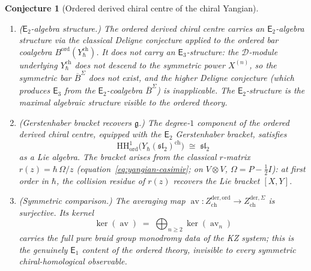 \documentclass[11pt,reqno]{amsart}
\newtheorem{conjecture}[theorem]{Conjecture}
\theoremstyle{definition}
\theoremstyle{remark}
\newcommand{\cD}{\mathcal{D}}
\newcommand{\HH}{\mathrm{HH}}
\newcommand{\Eone}{\mathsf{E}_{1}}
\newcommand{\Etwo}{\mathsf{E}_{2}}
\newcommand{\Ethree}{\mathsf{E}_{3}}
\DeclareMathOperator{\av}{av}
\newcommand{\fg}{\mathfrak{g}}
\newcommand{\BarSig}{\overline{B}^{\Sigma}}
\numberwithin{equation}{section}
\begin{document}
\begin{conjecture}[Ordered derived chiral centre of the
chiral Yangian]
\begin{enumerate}[label=\textup{(\roman*)}]
\item \textup{($\Etwo$-algebra structure.)}
  The ordered derived chiral centre carries an
  $\Etwo$-algebra structure via the classical Deligne
  conjecture applied to the ordered bar coalgebra
  $B^{\mathrm{ord}}(Y_\hbar^{\mathrm{ch}})$. It does
  \emph{not} carry an $\Ethree$-structure: the
  $\cD$-module underlying $Y_\hbar^{\mathrm{ch}}$ does
  not descend to the symmetric power $X^{(n)}$, so
  the symmetric bar $\BarSig$ does not exist, and the
  higher Deligne conjecture
  \textup{(}which produces $\Ethree$ from the
  $\Etwo$-coalgebra $\BarSig$\textup{)} is
  inapplicable. The $\Etwo$-structure is the maximal
  algebraic structure visible to the ordered theory.

\item \textup{(Gerstenhaber bracket recovers $\fg$.)}
  The degree-$1$ component of the ordered derived
  chiral centre, equipped with the $\Etwo$ Gerstenhaber
  bracket, satisfies
  \[
    \HH^1_{\mathrm{ord}}\bigl(
      Y_\hbar(\mathfrak{sl}_2)^{\mathrm{ch}}\bigr)
    \;\cong\; \mathfrak{sl}_2
  \]
  as a Lie algebra. The bracket arises from the
  classical $r$-matrix $r(z) = \hbar\,\Omega/z$
  (equation~\eqref{eq:yangian-casimir}; on
  $V \otimes V$, $\Omega = P - \tfrac{1}{2}I$):
  at first order in $\hbar$, the collision residue
  of $r(z)$ recovers the Lie bracket $[X,Y]$.

\item \textup{(Symmetric comparison.)}
  The averaging map $\av \colon
  Z^{\mathrm{der,ord}}_{\mathrm{ch}} \to
  Z^{\mathrm{der,}\Sigma}_{\mathrm{ch}}$ is surjective.
  Its kernel
  \[
    \ker(\av)
    \;=\; \bigoplus_{n \geq 2} \ker(\av_n)
  \]
  carries the full pure braid group monodromy data of
  the KZ system; this is the genuinely $\Eone$ content
  of the ordered theory, invisible to every symmetric
  chiral-homological observable.
\end{enumerate}
\end{conjecture}
\end{document}
